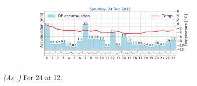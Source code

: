 \begin{figure}[ht!]
	\begin{subfigure}[b]{0.49\textwidth}
		\includegraphics[trim={4.9cm 1.cm 1.5cm 1cm},clip,
		width=\textwidth]{./fig_weathermast/T_P_U_20161224}
		\caption{} \label{fig:TPU24}
	\end{subfigure}
	\caption{\textit{(As .)} For \SI{24}{\dec} at \SI{12}{\UTC}.}\label{fig:weather:24}
\end{figure}

